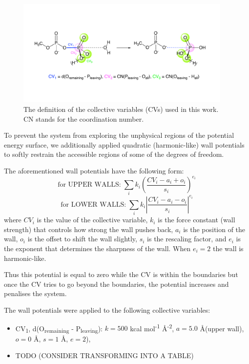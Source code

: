 \begin{figure}[t!]
    \centering
    \includegraphics[width=0.95\textwidth]{Figures/3_Computational_details/collective_variables.pdf}
    \caption{The definition of the collective variables (CVs) used in this work. CN stands for the coordination number.}
    \label{fig:collective_variables}
\end{figure}

To prevent the system from exploring the unphysical regions of the potential energy surface, we additionally applied quadratic (harmonic-like) wall potentials to softly restrain the accessible regions of some of the degrees of freedom. 

The aforementioned wall potentials have the following form:
\begin{equation}
    \text{for UPPER WALLS:} \; \sum_i k_i \left( \frac{CV_i - a_i + o_i}{s_i} \right)^{e_i}
    \label{eq:upper_wall}
\end{equation}
\begin{equation}
    \text{for LOWER WALLS:} \; \sum_i k_i \left| \frac{CV_i - a_i - o_i}{s_i} \right|^{e_i}
    \label{eq:lower_wall}
\end{equation}
where $CV_i$ is the value of the collective variable, $k_i$ is the force constant (wall strength) that controls how strong the wall pushes back, $a_i$ is the position of the wall, $o_i$ is the offset to shift the wall slightly, $s_i$ is the rescaling factor, and $e_i$ is the exponent that determines the sharpness of the wall. When $e_i = 2$ the wall is harmonic-like. 

Thus this potential is equal to zero while the CV is within the boundaries but once the CV tries to go beyond the boundaries, the potential increases and penalises the system.

The wall potentials were applied to the following collective variables:
\begin{itemize}
    \item CV\textsubscript{1}, d(O\textsubscript{remaining} - P\textsubscript{leaving}): $k = 500$ kcal mol\textsuperscript{-1} \AA\textsuperscript{-2}, $a = 5.0$ \AA (upper wall), $o = 0$ \AA, $s = 1$ \AA, $e = 2$),
    \item TODO (CONSIDER TRANSFORMING INTO A TABLE)
\end{itemize}

